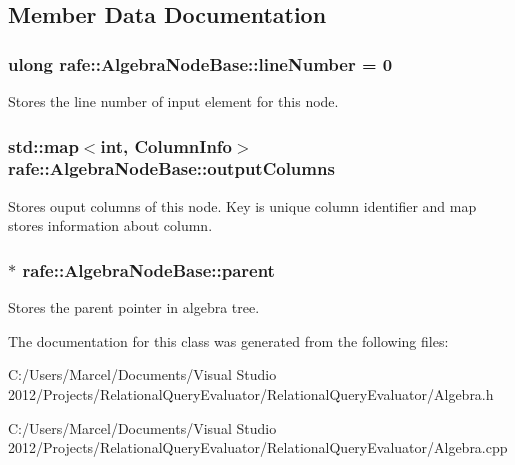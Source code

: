 \subsection{Member Data Documentation}
\hypertarget{classrafe_1_1_algebra_node_base_a9ad122f37de5260754daaf517d3d5ed0}{
\subsubsection[{line\+Number}]{\setlength{\rightskip}{0pt plus 5cm}ulong rafe\+::\+Algebra\+Node\+Base\+::line\+Number = 0}}\label{classrafe_1_1_algebra_node_base_a9ad122f37de5260754daaf517d3d5ed0}
Stores the line number of input element for this node. \hypertarget{classrafe_1_1_algebra_node_base_aadae640fc5528efe6ce06c2171ba8075}{
\subsubsection[{output\+Columns}]{\setlength{\rightskip}{0pt plus 5cm}std\+::map$<$int, {\bf Column\+Info}$>$ rafe\+::\+Algebra\+Node\+Base\+::output\+Columns}}\label{classrafe_1_1_algebra_node_base_aadae640fc5528efe6ce06c2171ba8075}
Stores ouput columns of this node. Key is unique column identifier and map stores information about column. \hypertarget{classrafe_1_1_algebra_node_base_a7dbfa2771e290b5e72bfe5c5177b7888}{
\subsubsection[{parent}]{$\ast$ rafe\+::\+Algebra\+Node\+Base\+::parent}}\label{classrafe_1_1_algebra_node_base_a7dbfa2771e290b5e72bfe5c5177b7888}
Stores the parent pointer in algebra tree. 

The documentation for this class was generated from the following files\+:\begin{DoxyCompactItemize}
\item 
C\+:/\+Users/\+Marcel/\+Documents/\+Visual Studio 2012/\+Projects/\+Relational\+Query\+Evaluator/\+Relational\+Query\+Evaluator/Algebra.\+h\item 
C\+:/\+Users/\+Marcel/\+Documents/\+Visual Studio 2012/\+Projects/\+Relational\+Query\+Evaluator/\+Relational\+Query\+Evaluator/Algebra.\+cpp\end{DoxyCompactItemize}
